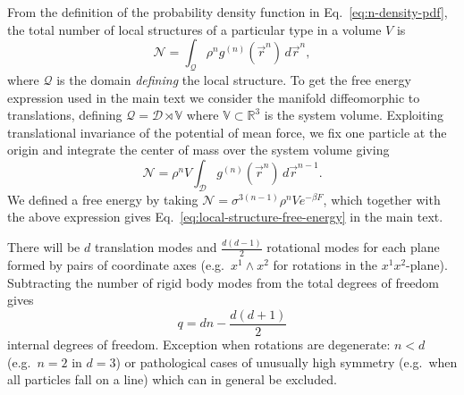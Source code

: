 \documentclass[11pt,twoside]{report}
\begin{document}
From the definition of the probability density function in Eq.\ \eqref{eq:n-density-pdf}, the total number of local structures of a particular type in a volume $V$ is
\begin{equation}\label{eq:structure-population}
  \mathcal{N} =
  \int_{\mathcal{Q}} \rho^n g^{(n)}(\vec{r}^n) \, d\vec{r}^n,
\end{equation}
where $\mathcal{Q}$ is the domain \emph{defining} the local structure.
To get the free energy expression used in the main text we consider the manifold diffeomorphic to translations, defining $\mathcal{Q} = \mathcal{D} \rtimes \mathbb{V}$ where $\mathbb{V}\subset \mathbb{R}^3$ is the system volume.
Exploiting translational invariance of the potential of mean force, we fix one particle at the origin and integrate the center of mass over the system volume giving
\begin{equation}
  \mathcal{N} =
  \rho^n V \int_{\mathcal{D}} g^{(n)}(\vec{r}^n) \, d\vec{r}^{n-1}.
\end{equation}
We defined a free energy by taking $\mathcal{N} = \sigma^{3(n-1)} \rho^n V e^{-\beta F}$, which together with the above expression gives Eq.\ \eqref{eq:local-structure-free-energy} in the main text.

There will be $d$ translation modes and $\frac{d(d-1)}{2}$ rotational modes for each plane formed by pairs of coordinate axes (e.g.\ $x^1 \wedge x^2$ for rotations in the $x^1x^2$-plane).
Subtracting the number of rigid body modes from the total degrees of freedom gives \[ q = dn - \frac{d(d+1)}{2} \] internal degrees of freedom.
Exception when rotations are degenerate: $n < d$ (e.g.\ $n=2$ in $d=3$) or pathological cases of unusually high symmetry (e.g.\ when all particles fall on a line) which can in general be excluded.
\end{document}
